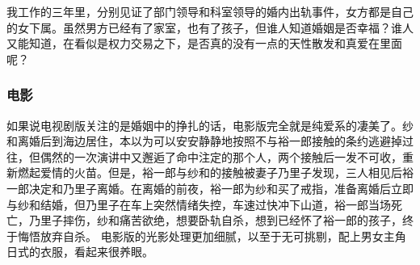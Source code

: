 我工作的三年里，分别见证了部门领导和科室领导的婚内出轨事件，女方都是自己的女下属。虽然男方已经有了家室，也有了孩子，但谁人知道婚姻是否幸福？谁人又能知道，在看似是权力交易之下，是否真的没有一点的天性散发和真爱在里面呢？

\subsubsection{电影}
如果说电视剧版关注的是婚姻中的挣扎的话，电影版完全就是纯爱系的凄美了。纱和离婚后到海边居住，本以为可以安安静静地按照不与裕一郎接触的条约逃避掉过往，但偶然的一次演讲中又邂逅了命中注定的那个人，两个接触后一发不可收，重新燃起爱情的火苗。但是，裕一郎与纱和的接触被妻子乃里子发现，三人相见后裕一郎决定和乃里子离婚。在离婚的前夜，裕一郎为纱和买了戒指，准备离婚后立即与纱和结婚，但乃里子在车上突然情绪失控，车速过快冲下山道，裕一郎当场死亡，乃里子摔伤，纱和痛苦欲绝，想要卧轨自杀，想到已经怀了裕一郎的孩子，终于悔悟放弃自杀。
电影版的光影处理更加细腻，以至于无可挑剔，配上男女主角日式的衣服，看起来很养眼。
